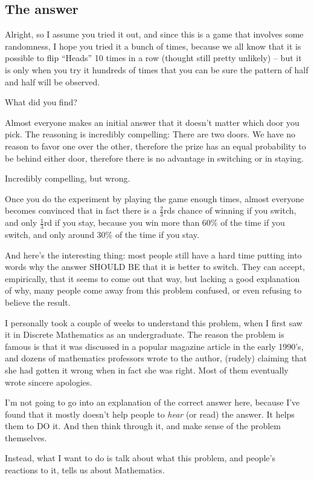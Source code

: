 \subsection{The answer}
Alright, so I assume you tried it out, and since this is a game that
involves some randomness, I hope you tried it a bunch of times,
because we all know that it is possible to flip ``Heads'' 10 times in
a row (thought still pretty unlikely) -- but it is only when you try it
hundreds of times that you can be sure the pattern of half and half
will be observed.


What did you find?


Almost everyone makes an initial answer that it doesn't matter which
door you pick.  The reasoning is incredibly compelling: There are two
doors.  We have no reason to favor one over the other, therefore the
prize has an equal probability to be behind either door, therefore
there is no advantage in switching or in staying.


Incredibly compelling, but wrong.


Once you do the experiment by playing the game enough times, almost
everyone becomes convinced that in fact there is a $\frac{2}{3}$rds
chance of winning if you switch, and only $\frac{1}{3}$rd if you stay,
because you win more than 60\% of the time if you switch, and only
around 30\% of the time if you stay.


And here's the interesting thing: most people still have a hard time
putting into words why the answer SHOULD BE that it is better to
switch.  They can accept, empirically, that it seems to come out that
way, but lacking a good explanation of why, many people come away from
this problem confused, or even refusing to believe the result.


I personally took a couple of weeks to understand this problem, when I
first saw it in Discrete Mathematics as an undergraduate.  The reason
the problem is famous is that it was discussed in a popular magazine
article in the early 1990's, and dozens of mathematics professors
wrote to the author, (rudely) claiming that she had gotten it wrong
when in fact she was right.  Most of them eventually wrote sincere
apologies.


I'm not going to go into an explanation of the correct answer here,
because I've found that it mostly doesn't help people to \emph{hear}
(or read) the answer.  It helps them to DO it.  And then think through
it, and make sense of the problem themselves.


Instead, what I want to do is talk about what this problem, and
people's reactions to it, tells us about Mathematics.

